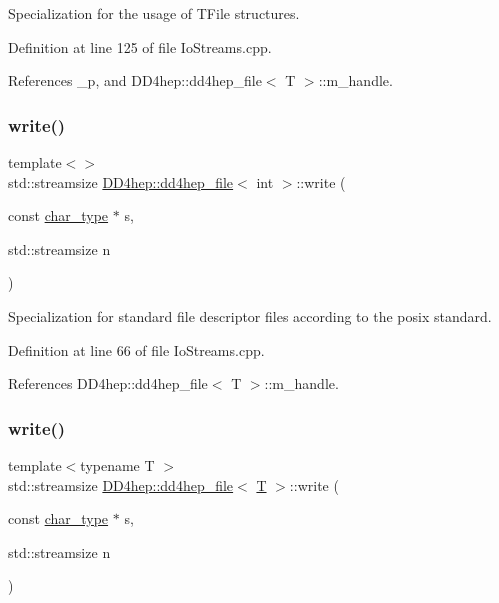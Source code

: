 Specialization for the usage of T\+File structures. 



Definition at line 125 of file Io\+Streams.\+cpp.



References \+\_\+p, and D\+D4hep\+::dd4hep\+\_\+file$<$ T $>$\+::m\+\_\+handle.

\hypertarget{class_d_d4hep_1_1dd4hep__file_aaa76e0a0640001e28c8a46716f2332fd}{}\label{class_d_d4hep_1_1dd4hep__file_aaa76e0a0640001e28c8a46716f2332fd} 
\subsubsection{\texorpdfstring{write()}{write()}\hspace{0.1cm}{\footnotesize\ttfamily [1/3]}}
{\footnotesize\ttfamily template$<$$>$ \\
std\+::streamsize \hyperlink{class_d_d4hep_1_1dd4hep__file}{D\+D4hep\+::dd4hep\+\_\+file}$<$ int $>$\+::write (\begin{DoxyParamCaption}\item[{const \hyperlink{class_d_d4hep_1_1dd4hep__file_aef4242f7f2fe15a59f7bf7a8f6ba24d5}{char\+\_\+type} $\ast$}]{s,  }\item[{std\+::streamsize}]{n }\end{DoxyParamCaption})}



Specialization for standard file descriptor files according to the posix standard. 



Definition at line 66 of file Io\+Streams.\+cpp.



References D\+D4hep\+::dd4hep\+\_\+file$<$ T $>$\+::m\+\_\+handle.

\hypertarget{class_d_d4hep_1_1dd4hep__file_a33bb5fb24cdaf006ff9143d0d03f9bd3}{}\label{class_d_d4hep_1_1dd4hep__file_a33bb5fb24cdaf006ff9143d0d03f9bd3} 
\subsubsection{\texorpdfstring{write()}{write()}\hspace{0.1cm}{\footnotesize\ttfamily [2/3]}}
{\footnotesize\ttfamily template$<$typename T $>$ \\
std\+::streamsize \hyperlink{class_d_d4hep_1_1dd4hep__file}{D\+D4hep\+::dd4hep\+\_\+file}$<$ \hyperlink{class_t}{T} $>$\+::write (\begin{DoxyParamCaption}\item[{const \hyperlink{class_d_d4hep_1_1dd4hep__file_aef4242f7f2fe15a59f7bf7a8f6ba24d5}{char\+\_\+type} $\ast$}]{s,  }\item[{std\+::streamsize}]{n }\end{DoxyParamCaption})}



